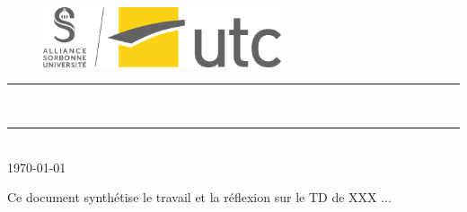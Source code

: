 \thispagestyle{empty} %
\setcounter{page}{0} %

\begin{figure}[H]
\centering
\includegraphics[width=7cm]{./Graphismes-UTC/logos/UTC/logo_UTC.pdf}
\end{figure}

\vspace{3cm}

\begin{center}

{\color{jauneUTC}\rule{\linewidth}{0.8mm}}
\vspace*{0mm}

\Huge{\textbf{\theUV \\ \thetitle}}
{\color{jauneUTC}\rule{\linewidth}{0.8mm}}

\vspace{0.5cm}
\Large{\theauthor} \\
\Large{\today}
\end{center}
 
\vspace{3cm}

\begin{myabstract}
Ce document synthétise le travail et la réflexion sur le TD de XXX ...
\end{myabstract}

\clearpage
